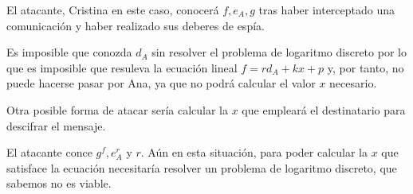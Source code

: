 \begin{problem}[3]
\spart

El atacante, Cristina en este caso, conocerá $f,e_A,g$ tras haber interceptado una comunicación y haber realizado sus deberes de espía.

Es imposible que conozda $d_A$ sin resolver el problema de logaritmo discreto por lo que es imposible que resuleva la ecuación lineal $f = rd_A+kx + p$ y, por tanto, no puede hacerse pasar por Ana, ya que no podrá calcular el valor $x$ necesario.

Otra posible forma de atacar sería calcular la $x$ que empleará el destinatario para descifrar el mensaje. 

El atacante conce $g^f,e_A^r$ y $r$. Aún en esta situación, para poder calcular la $x$ que satisface la ecuación necesitaría resolver un problema de logaritmo discreto, que sabemos no es viable.
\end{problem}


